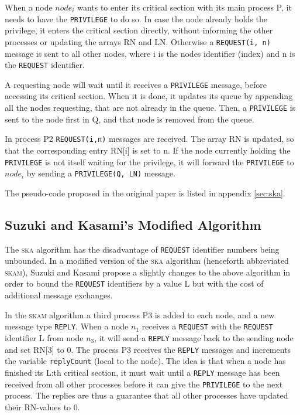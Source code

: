 \documentclass[a4paper,10pt]{llncs}
\begin{document}
When a node $node_i$ wants to enter its critical section with its main process P, it needs to have the \texttt{PRIVILEGE} to do so. In case the node already holds the privilege, it enters the critical section directly, without informing the other processes or updating the arrays RN and LN. Otherwise a \texttt{REQUEST(i, n)} message is sent to all other nodes, where i is the nodes identifier (index) and n is the \texttt{REQUEST} identifier.

A requesting node will wait until it receives a \texttt{PRIVILEGE} message, before accessing its critical section. When it is done, it updates its queue by appending all the nodes requesting, that are not already in the queue. Then, a \texttt{PRIVILEGE} is sent to the node first in Q, and that node is removed from the queue.

In process P2 \texttt{REQUEST(i,n)} messages are received. The array RN is updated, so that the corresponding entry RN[i] is set to n. If the node currently holding the \texttt{PRIVILEGE} is not itself waiting for the privilege, it will forward the \texttt{PRIVILEGE} to $node_i$ by sending a \texttt{PRIVILEGE(Q, LN)} message.

The pseudo-code proposed in the original paper is listed in appendix \ref{sec:ska}.

\subsection{Suzuki and Kasami's Modified Algorithm}
The \textsc{ska} algorithm has the disadvantage of \texttt{REQUEST} identifier numbers being unbounded. In a modified version of the \textsc{ska} algorithm (henceforth abbreviated \textsc{skam}), Suzuki and Kasami propose a slightly changes to the above algorithm in order to bound the \texttt{REQUEST} identifiers by a value L but with the cost of additional message exchanges.

In the \textsc{skam} algorithm a third process P3 is added to each node, and a new message type \texttt{REPLY}. When a node $n_1$ receives a \texttt{REQUEST} with the \texttt{REQUEST} identifier L from node $n_3$, it will send a \texttt{REPLY} message back to the sending node and set RN[3] to 0. The process P3 receives the \texttt{REPLY} messages and increments the variable \texttt{replyCount} (local to the node). The idea is that when a node has finished its L:th critical section, it must wait until a \texttt{REPLY} message has been received from all other processes before it can give the \texttt{PRIVILEGE} to the next process. The replies are thus a guarantee that all other processes have updated their RN-values to 0.
\end{document}
